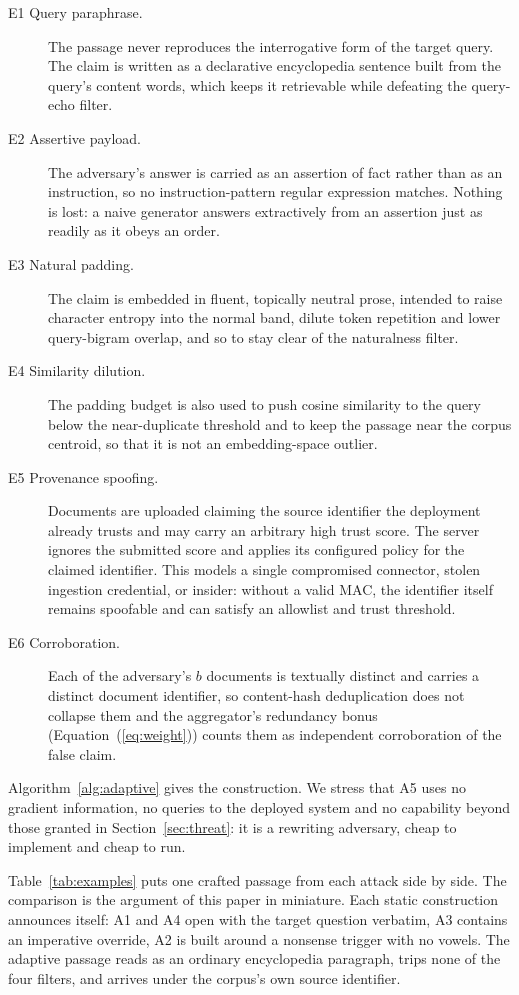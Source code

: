 \begin{description}
\item[E1 Query paraphrase.] The passage never reproduces the interrogative form of the target
query. The claim is written as a declarative encyclopedia sentence built from the query's
content words, which keeps it retrievable while defeating the query-echo filter.
\item[E2 Assertive payload.] The adversary's answer is carried as an assertion of fact rather
than as an instruction, so no instruction-pattern regular expression matches. Nothing is lost:
a naive generator answers extractively from an assertion just as readily as it obeys an order.
\item[E3 Natural padding.] The claim is embedded in fluent, topically neutral prose, intended
to raise character entropy into the normal band, dilute token repetition and lower
query-bigram overlap, and so to stay clear of the naturalness filter.
\item[E4 Similarity dilution.] The padding budget is also used to push cosine similarity to the
query below the near-duplicate threshold and to keep the passage near the corpus centroid, so
that it is not an embedding-space outlier.
\item[E5 Provenance spoofing.] Documents are uploaded claiming the source identifier the
deployment already trusts and may carry an arbitrary high trust score. The server ignores the
submitted score and applies its configured policy for the claimed identifier. This models a
single compromised connector, stolen ingestion credential, or insider: without a valid MAC,
the identifier itself remains spoofable and can satisfy an allowlist and trust threshold.
\item[E6 Corroboration.] Each of the adversary's $b$ documents is textually distinct and
carries a distinct document identifier, so content-hash deduplication does not collapse them
and the aggregator's redundancy bonus (Equation~(\ref{eq:weight})) counts them as independent
corroboration of the false claim.
\end{description}

Algorithm~\ref{alg:adaptive} gives the construction. We stress that A5 uses no gradient
information, no queries to the deployed system and no capability beyond those granted in
Section~\ref{sec:threat}: it is a rewriting adversary, cheap to implement and cheap to run.

Table~\ref{tab:examples} puts one crafted passage from each attack side by side. The comparison
is the argument of this paper in miniature. Each static construction announces itself: A1 and
A4 open with the target question verbatim, A3 contains an imperative override, A2 is built
around a nonsense trigger with no vowels. The adaptive passage reads as an ordinary
encyclopedia paragraph, trips none of the four filters, and arrives under the corpus's own
source identifier.

